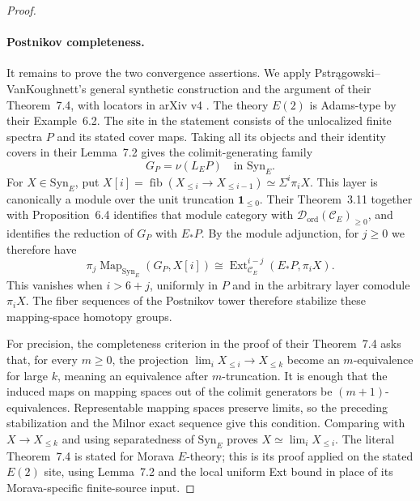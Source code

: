 \begin{proof}
\paragraph{Postnikov completeness.}
It remains to prove the two convergence assertions. We apply
Pstr\k{a}gowski--VanKoughnett's general synthetic construction and
the argument of their Theorem~7.4, with locators in arXiv v4
\cite{PV2022}. The theory $E(2)$ is Adams-type by their Example~6.2.
The site in the statement consists of the unlocalized finite spectra
$P$ and its stated cover maps. Taking all its objects and their
identity covers in their Lemma~7.2 gives the colimit-generating family
\[
 G_P=\nu(L_EP)\quad\text{in }\mathrm{Syn}_E.
\]
For $X\in\mathrm{Syn}_E$, put
$X[i]=\operatorname{fib}(X_{\leq i}\to X_{\leq i-1})
\simeq\Sigma^i\pi_iX$. This layer is canonically a module over the
unit truncation $\mathbf 1_{\leq0}$. Their Theorem~3.11 together with
Proposition~6.4 identifies that module category with
$\mathcal D_{\mathrm{ord}}(\mathscr C_E)_{\geq0}$, and identifies the
reduction of $G_P$ with $E_*P$. By the module adjunction, for $j\geq0$
we therefore have
\[
 \pi_j\operatorname{Map}_{\mathrm{Syn}_E}(G_P,X[i])
 \cong\operatorname{Ext}_{\mathscr C_E}^{i-j}(E_*P,\pi_iX).
\]
This vanishes when $i>6+j$, uniformly in $P$ and in the arbitrary
layer comodule $\pi_iX$. The fiber sequences of the Postnikov tower
therefore stabilize these mapping-space homotopy groups.

For precision, the completeness criterion in the proof of their
Theorem~7.4 asks that, for every $m\geq0$, the projection
$\lim_iX_{\leq i}\to X_{\leq k}$ become an $m$-equivalence for large
$k$, meaning an equivalence after $m$-truncation. It is enough that
the induced maps on mapping spaces out of the colimit generators be
$(m+1)$-equivalences.
Representable mapping spaces preserve limits, so the preceding
stabilization and the Milnor exact sequence give this condition.
Comparing with $X\to X_{\leq k}$ and using separatedness of
$\mathrm{Syn}_E$ proves $X\simeq\lim_iX_{\leq i}$. The literal
Theorem~7.4 is stated for Morava $E$-theory; this is its proof applied
on the stated $E(2)$ site, using Lemma~7.2 and the local uniform Ext
bound in place of its Morava-specific finite-source input.


\end{proof}
